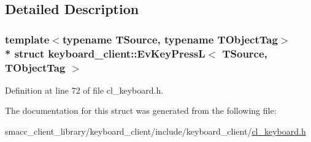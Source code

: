 \subsection{Detailed Description}
\subsubsection*{template$<$typename T\+Source, typename T\+Object\+Tag$>$\\*
struct keyboard\+\_\+client\+::\+Ev\+Key\+Press\+L$<$ T\+Source, T\+Object\+Tag $>$}



Definition at line 72 of file cl\+\_\+keyboard.\+h.



The documentation for this struct was generated from the following file\+:\begin{DoxyCompactItemize}
\item 
smacc\+\_\+client\+\_\+library/keyboard\+\_\+client/include/keyboard\+\_\+client/\hyperlink{cl__keyboard_8h}{cl\+\_\+keyboard.\+h}\end{DoxyCompactItemize}
